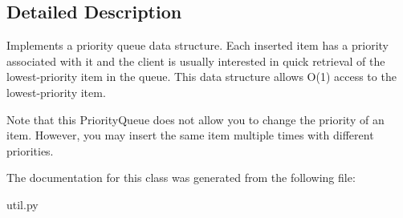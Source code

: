 \subsection{Detailed Description}
\begin{DoxyVerb}  Implements a priority queue data structure. Each inserted item
  has a priority associated with it and the client is usually interested
  in quick retrieval of the lowest-priority item in the queue. This
  data structure allows O(1) access to the lowest-priority item.
  
  Note that this PriorityQueue does not allow you to change the priority
  of an item.  However, you may insert the same item multiple times with
  different priorities.
\end{DoxyVerb}
 

The documentation for this class was generated from the following file\+:\begin{DoxyCompactItemize}
\item 
util.\+py\end{DoxyCompactItemize}
